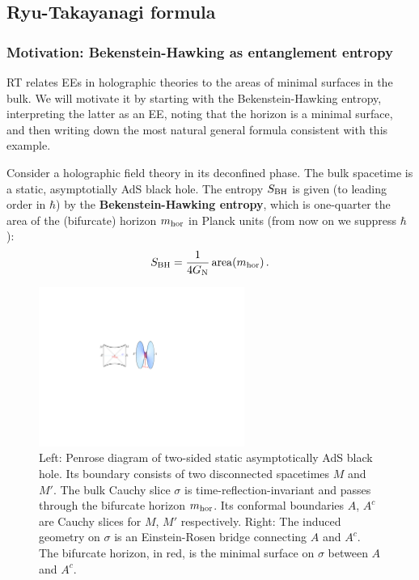 \documentclass[11pt]{article}
\newcommand{\GN}{G_{\rm N}}
\DeclareMathOperator{\area}{area}
\begin{document}
\subsection{Ryu-Takayanagi formula}
\label{sec:RT formula}

\subsubsection{Motivation: Bekenstein-Hawking as entanglement entropy}

RT relates EEs in holographic theories to the areas of minimal surfaces in the bulk. We will motivate it by starting with the Bekenstein-Hawking entropy, interpreting the latter as an EE, noting that the horizon is a minimal surface, and then writing down the most natural general formula consistent with this example.

Consider a holographic field theory in its deconfined phase. The bulk spacetime is a static, asymptotially AdS black hole. The entropy $S_{\rm BH}$ is given (to leading order in $\hbar$) by the \textbf{Bekenstein-Hawking entropy}, which is one-quarter the area of the (bifurcate) horizon $m_{\rm hor}$ in Planck units (from now on we suppress $\hbar$):
\begin{equation}\label{bhentropy}
S_{\rm BH} = \frac1{4\GN}\area(m_{\rm hor})\,.
\end{equation}

\begin{figure}[tbp]
\centering
\includegraphics[width=0.6\textwidth]{figs/twosided}
\caption{\label{fig:twosided}
Left: Penrose diagram of two-sided static asymptotically AdS black hole. Its boundary consists of two disconnected spacetimes $M$ and $M'$. The bulk Cauchy slice $\sigma$ is time-reflection-invariant and passes through the bifurcate horizon $m_{\rm hor}$. Its conformal boundaries $A$, $A^c$ are Cauchy slices for $M$, $M'$ respectively. Right: The induced geometry on $\sigma$ is an Einstein-Rosen bridge connecting $A$ and $A^c$. The bifurcate horizon, in red, is the minimal surface on $\sigma$ between $A$ and $A^c$.
}
\end{figure}
\end{document}

